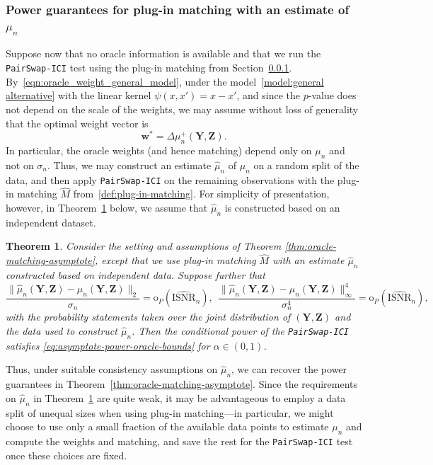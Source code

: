 \documentclass[12pt]{article}
\newtheorem{theorem}{Theorem}%
\newcommand{\bY}{\mathbf{Y}}
\newcommand{\bZ}{\mathbf{Z}}
\newcommand{\bw}{\mathbf{w}}
\begin{document}
\subsubsection{Power guarantees for plug-in matching with an estimate of $\mu_n$}\label{sec:power_with_estimated_mu}
 Suppose now that no oracle information is available and that we run the \texttt{PairSwap-ICI} test using the plug-in matching from Section~\ref{sec:power_with_estimated_mu}.  By~\eqref{eqn:oracle_weight_general_model}, under the model~\eqref{model:general alternative} with the linear kernel $\psi(x,x')=x-x'$, and since the $p$-value does not depend on the scale of the weights, we may assume without loss of generality that the optimal weight vector is 
\[
\bw^*=\Delta\mu_n^+(\bY,\bZ).
\]
In particular, the oracle weights (and hence matching) depend only on $\mu_n$ and not on $\sigma_n$. Thus, we may construct an estimate $\hat\mu_n$ of $\mu_n$ on a random split of the data, and then apply \texttt{PairSwap-ICI} on the remaining observations with the plug-in matching $\hat M$ from~\eqref{def:plug-in-matching}. For simplicity of presentation, however, in Theorem~\ref{thm:oracle-matching-estimated-mu} below, we assume that $\hat{\mu}_n$ is constructed based on an independent dataset. 
\begin{theorem}\label{thm:oracle-matching-estimated-mu}
    Consider the setting and assumptions of Theorem \ref{thm:oracle-matching-asymptote}, except that we use plug-in matching $\hat{M}$ with an estimate $\hat\mu_n$ constructed based on independent data.  Suppose further that
    \[
    \frac{\|\hat\mu_n(\bY,\bZ)-\mu_n(\bY,\bZ)\|_2}{\sigma_n} =\mathrm{o}_P(\widehat{\mathrm{ISNR}}_n), ~~\frac{\|\hat\mu_n(\bY,\bZ)-\mu_n(\bY,\bZ)\|_\infty^4}{\sigma_n^4} =\mathrm{o}_P(\widehat{\mathrm{ISNR}}_n),
    \]
    with the probability statements taken over the joint distribution of $(\bY,\bZ)$ and the data used to construct $\hat{\mu}_n$.  Then the conditional power of the \textnormal{\texttt{PairSwap-ICI}} satisfies \eqref{eq:asymptote-power-oracle-bounds} for $\alpha \in (0,1)$.
\end{theorem}
Thus, under suitable consistency assumptions on $\hat\mu_n$, we can recover the power guarantees in Theorem~\ref{thm:oracle-matching-asymptote}. Since the requirements on $\hat{\mu}_n$ in Theorem~\ref{thm:oracle-matching-estimated-mu} are quite weak, it may be advantageous to employ a data split of unequal sizes when using plug-in matching---in particular, we might choose to use only a small fraction of the available data points to estimate $\mu_n$ and compute the weights and matching, and save the rest for the \textnormal{\texttt{PairSwap-ICI}} test once these choices are fixed. 
\end{document}
